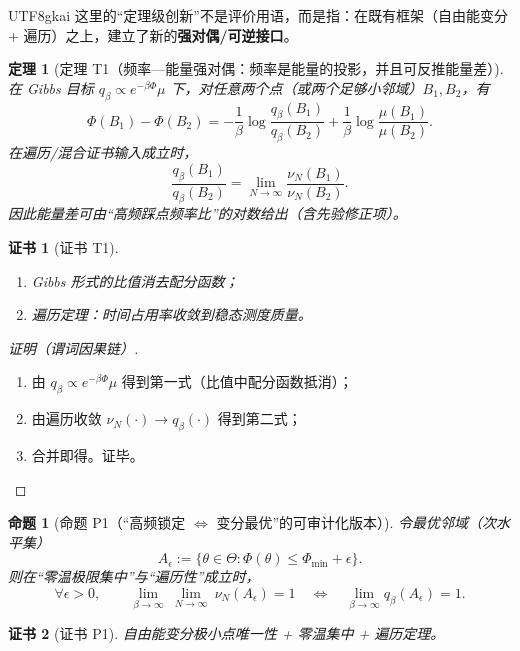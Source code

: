 \documentclass[12pt]{article}
\newtheorem{theorem}{定理}[section]
\newtheorem{proposition}{命题}[section]
\newtheorem{Certificate}{证书}[section]
\begin{document}
\begin{CJK*}{UTF8}{gkai}
这里的“定理级创新”不是评价用语，而是指：在既有框架（自由能变分 + 遍历）之上，建立了新的\textbf{强对偶/可逆接口}。

\begin{theorem}[定理 T1（频率—能量强对偶：频率是能量的投影，并且可反推能量差）]
\label{thm:tex27-ch23-t1}
在 Gibbs 目标 $q_\beta\propto e^{-\beta\Phi}\mu$ 下，对任意两个点（或两个足够小邻域）$B_1,B_2$，有
\[
  \Phi(B_1)-\Phi(B_2)
  =
  -\frac{1}{\beta}\log\frac{q_\beta(B_1)}{q_\beta(B_2)}
  +\frac{1}{\beta}\log\frac{\mu(B_1)}{\mu(B_2)}.
\]
在遍历/混合证书输入成立时，
\[
  \frac{q_\beta(B_1)}{q_\beta(B_2)}
  =
  \lim_{N\to\infty}\frac{\nu_N(B_1)}{\nu_N(B_2)}.
\]
因此能量差可由“高频踩点频率比”的对数给出（含先验修正项）。
\end{theorem}

\begin{Certificate}[证书 T1]
\label{cert:tex27-ch23-t1}
\begin{enumerate}
  \item Gibbs 形式的比值消去配分函数；
  \item 遍历定理：时间占用率收敛到稳态测度质量。
\end{enumerate}
\end{Certificate}

\begin{proof}[证明（谓词因果链）]
\begin{enumerate}
  \item 由 $q_\beta\propto e^{-\beta\Phi}\mu$ 得到第一式（比值中配分函数抵消）；
  \item 由遍历收敛 $\nu_N(\cdot)\to q_\beta(\cdot)$ 得到第二式；
  \item 合并即得。证毕。
\end{enumerate}
\end{proof}

\begin{proposition}[命题 P1（“高频锁定 $\Leftrightarrow$ 变分最优”的可审计化版本）]
\label{prop:tex27-ch23-p1}
令最优邻域（次水平集）
\[
  A_\epsilon:=\{\theta\in\Theta:\Phi(\theta)\le \Phi_{\min}+\epsilon\}.
\]
则在“零温极限集中”与“遍历性”成立时，
\[
  \forall \epsilon>0,\qquad
  \lim_{\beta\to\infty}\ \lim_{N\to\infty}\ \nu_N(A_\epsilon)=1
  \quad\Longleftrightarrow\quad
  \lim_{\beta\to\infty} q_\beta(A_\epsilon)=1.
\]
\end{proposition}

\begin{Certificate}[证书 P1]
\label{cert:tex27-ch23-p1}
自由能变分极小点唯一性 + 零温集中 + 遍历定理。
\end{Certificate}


\end{CJK*}
\end{document}

